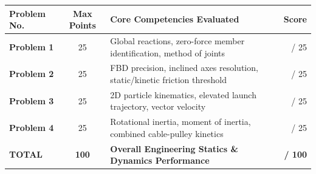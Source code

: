 \documentclass[11pt, a4paper, titlepage=false]{scrartcl}
\begin{document}
\begin{table}[h!]
    \centering
    \small
    \begin{tabularx}{\textwidth}{@{} l c X r @{}}
        \toprule
        \textbf{Problem No.} & \textbf{Max Points} & \textbf{Core Competencies Evaluated} & \textbf{Score} \\
        \midrule
        \textbf{Problem 1} & 25 & Global reactions, zero-force member identification, method of joints & \hspace{1.5cm} / 25 \\
        \textbf{Problem 2} & 25 & FBD precision, inclined axes resolution, static/kinetic friction threshold & \hspace{1.5cm} / 25 \\
        \textbf{Problem 3} & 25 & 2D particle kinematics, elevated launch trajectory, vector velocity & \hspace{1.5cm} / 25 \\
        \textbf{Problem 4} & 25 & Rotational inertia, moment of inertia, combined cable-pulley kinetics & \hspace{1.5cm} / 25 \\
        \midrule
        \textbf{TOTAL} & \textbf{100} & \textbf{Overall Engineering Statics \& Dynamics Performance} & \textbf{/ 100} \\
        \bottomrule
    \end{tabularx}
\end{table}
\end{document}
